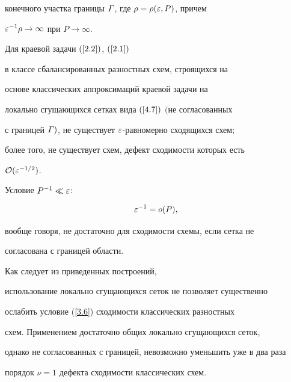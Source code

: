 конечного участка границы $\varGamma$, где $\rho=\rho(\varepsilon,P)$, причем


$\varepsilon^{-1}\rho\to \infty$ при $P\to\infty$.





\begin{thms} \label{t.4.1}


Для краевой задачи $(\ref{2.2})$, $(\ref{2.1})$


в классе сбалансированных разностных схем, строящихся на


основе классических аппроксимаций краевой задачи на


локально сгущающихся сетках вида $(\ref{4.7})$ $($не согласованных


с границей $\varGamma)$, не существует $\varepsilon$-равномерно сходящихся схем$;$


более того, не существует схем, дефект сходимости которых есть


${\cal O} (\varepsilon^{-1/2})$.


\end{thms}





\begin{note}


Условие $P^{-1}\ll \varepsilon$:


\begin{equation} \label{4.8}


\eps^{-1}=o(P),


\end{equation}


вообще говоря, не достаточно для сходимости схемы, если сетка не


согласована с границей области.


\end{note}





\begin{note}


Как следует из приведенных построений,


использование локально сгущающихся сеток не позволяет существенно


ослабить условие (\ref{3.6}) сходимости классических разностных


схем. Применением достаточно общих локально сгущающихся сеток,


однако не согласованных с границей, невозможно уменьшить уже в два раза


порядок $\nu=1$ дефекта сходимости классических схем.


\end{note}





